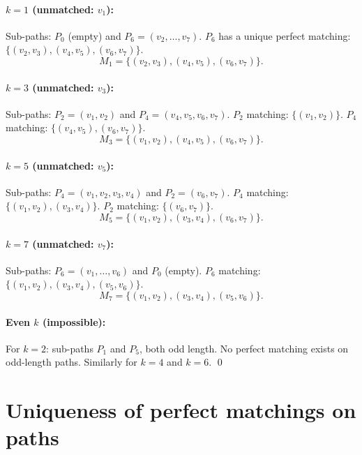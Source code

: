 \documentclass[11pt,letterpaper]{article}
\numberwithin{equation}{section}
\begin{document}
\paragraph{$k = 1$ (unmatched: $v_1$):}
Sub-paths: $P_0$ (empty) and $P_6 = (v_2, \ldots, v_7)$.
$P_6$ has a unique perfect matching: $\{(v_2,v_3), (v_4,v_5), (v_6,v_7)\}$.
\begin{equation}
  M_1 = \{(v_2,v_3), (v_4,v_5), (v_6,v_7)\}.
\end{equation}

\paragraph{$k = 3$ (unmatched: $v_3$):}
Sub-paths: $P_2 = (v_1, v_2)$ and $P_4 = (v_4, v_5, v_6, v_7)$.
$P_2$ matching: $\{(v_1,v_2)\}$. $P_4$ matching: $\{(v_4,v_5), (v_6,v_7)\}$.
\begin{equation}
  M_3 = \{(v_1,v_2), (v_4,v_5), (v_6,v_7)\}.
\end{equation}

\paragraph{$k = 5$ (unmatched: $v_5$):}
Sub-paths: $P_4 = (v_1, v_2, v_3, v_4)$ and $P_2 = (v_6, v_7)$.
$P_4$ matching: $\{(v_1,v_2), (v_3,v_4)\}$. $P_2$ matching: $\{(v_6,v_7)\}$.
\begin{equation}
  M_5 = \{(v_1,v_2), (v_3,v_4), (v_6,v_7)\}.
\end{equation}

\paragraph{$k = 7$ (unmatched: $v_7$):}
Sub-paths: $P_6 = (v_1, \ldots, v_6)$ and $P_0$ (empty).
$P_6$ matching: $\{(v_1,v_2), (v_3,v_4), (v_5,v_6)\}$.
\begin{equation}
  M_7 = \{(v_1,v_2), (v_3,v_4), (v_5,v_6)\}.
\end{equation}

\paragraph{Even $k$ (impossible):}
For $k = 2$: sub-paths $P_1$ and $P_5$, both odd length. No perfect matching
exists on odd-length paths. Similarly for $k = 4$ and $k = 6$. \qed

\section{Uniqueness of perfect matchings on paths}
\label{sec:path_matchings}
\end{document}
